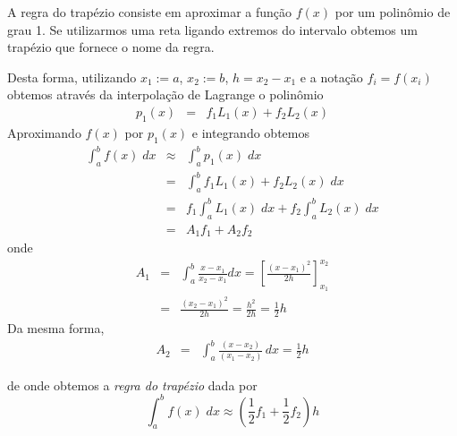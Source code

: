 A regra do trapézio consiste em aproximar a função $f(x)$ por um polinômio de grau 1. Se utilizarmos uma reta ligando extremos do intervalo obtemos um trapézio que fornece o nome da regra. 


Desta forma, utilizando $x_1:=a$,  $x_2:=b$, $h=x_2-x_1$ e a notação $f_i=f(x_i)$ obtemos através da interpolação de Lagrange o polinômio
\begin{eqnarray} 
p_1(x) &=& f_1 L_1(x)+ f_2 L_2(x) 
\end{eqnarray}
Aproximando $f(x)$ por $p_1(x)$ e integrando obtemos
\begin{eqnarray*}
  \int_a^bf(x)\;dx &\approx& \int_a^bp_1(x)\;dx \\
    &=& \int_a^b f_1L_1(x) + f_2L_2(x)\;dx \\
    &=& f_1 \int_a^b L_1(x)\;dx + f_2 \int_a^b L_2(x)\;dx \\
    &=& A_1 f_1 + A_2 f_2 
\end{eqnarray*}
onde
\begin{eqnarray*}
  A_1 &=& \int_a^b\frac{x-x_1}{x_2-x_1}dx =  \left[\frac{(x-x_1)^2}{2h}\right]_{x_1}^{x_2}\\
      &=& \frac{(x_2-x_1)^2}{2h} = \frac{h^2}{2h} = \frac{1}{2}h
\end{eqnarray*}
Da mesma forma,
\begin{eqnarray*}
  A_2 &=& \int_a^b\frac{(x-x_2)}{(x_1-x_2)}\,dx = \frac{1}{2}h
\end{eqnarray*}


de onde obtemos a \emph{regra do trapézio} dada por
\begin{equation}
  \int_a^b f(x)\;dx \approx \left(\frac{1}{2}f_1 + \frac{1}{2}f_2\right)h 
\end{equation}


